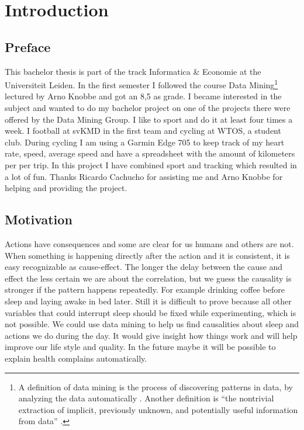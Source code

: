 \section{Introduction}
	\subsection{Preface}
		This bachelor thesis is part of the track Informatica \& Economie at the Universiteit Leiden. In the first semester I followed the course Data Mining\footnote{A definition of data mining is the process of discovering patterns in data, by analyzing the data automatically \cite{datamining}. Another definition is ``the nontrivial extraction of implicit, previously unknown, and potentially useful information from data'' \cite{frawley}.} lectured by Arno Knobbe and got an 8,5 as grade. I became interested in the subject and wanted to do my bachelor project on one of the projects there were offered by the Data Mining Group. I like to sport and do it at least four times a week. I football at svKMD in the first team and cycling at WTOS, a student club. During cycling I am using a Garmin Edge 705 to keep track of my heart rate, speed, average speed and have a spreadsheet with the amount of kilometers per per trip. In this project I have combined sport and tracking which resulted in a lot of fun. Thanks Ricardo Cachucho for assisting me and Arno Knobbe for helping and providing the project.

	\subsection{Motivation}
		\label{seq:motivation}
		Actions have consequences and some are clear for us humans and others are not. When something is happening directly after the action and it is consistent, it is easy recognizable as cause-effect. The longer the delay between the cause and effect the less certain we are about the correlation, but we guess the causality is stronger if the pattern happens repeatedly. For example drinking coffee before sleep and laying awake in bed later. Still it is difficult to prove because all other variables that could interrupt sleep should be fixed while experimenting, which is not possible. We could use data mining to help us find causalities about sleep and actions we do during the day. It would give insight how things work and will help improve our life style and quality. In the future maybe it will be possible to explain health complains automatically.

